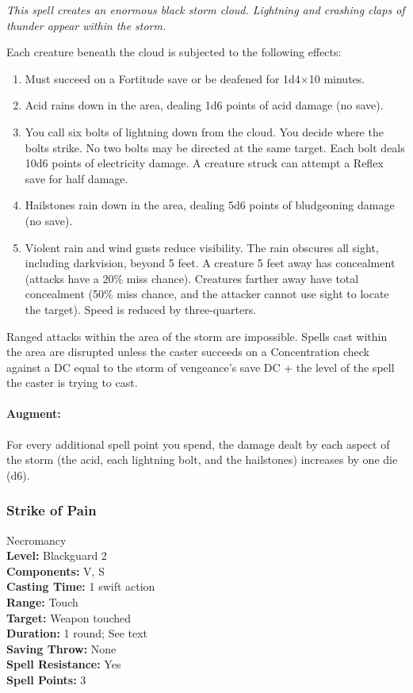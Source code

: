 \emph{This spell creates an enormous black storm cloud. Lightning and crashing claps of thunder appear within the storm. }

Each creature beneath the cloud is subjected to the following effects:

\begin{enumerate}
 \item Must succeed on a Fortitude save or be deafened for 1d4$\times$10 minutes.
 \item Acid rains down in the area, dealing 1d6 points of acid damage (no save).
 \item You call six bolts of lightning down from the cloud. You decide where the bolts strike. No two bolts may be directed at the same target. Each bolt deals 10d6 points of electricity damage. A creature struck can attempt a Reflex save for half damage.
 \item Hailstones rain down in the area, dealing 5d6 points of bludgeoning damage (no save).
 \item Violent rain and wind gusts reduce visibility. The rain obscures all sight, including darkvision, beyond 5 feet. A creature 5 feet away has concealment (attacks have a 20\% miss chance). Creatures farther away have total concealment (50\% miss chance, and the attacker cannot use sight to locate the target). Speed is reduced by three-quarters.
\end{enumerate}
Ranged attacks within the area of the storm are impossible. 
Spells cast within the area are disrupted unless the caster succeeds on a Concentration check against a DC equal to the storm of vengeance's save DC + the level of the spell the caster is trying to cast.
\paragraph{Augment:} For every additional spell point you spend, the damage dealt by each aspect of the storm (the acid, each lightning bolt, and the hailstones) increases by one die (d6).
\subsubsection{Strike of Pain}
\label{Spell:StrikeOfPain}
Necromancy
\\ \textbf{Level:} Blackguard 2
\\ \textbf{Components:} V, S
\\ \textbf{Casting Time:} 1 swift action
\\ \textbf{Range:} Touch
\\ \textbf{Target:} Weapon touched
\\ \textbf{Duration:} 1 round; See text
\\ \textbf{Saving Throw:} None
\\ \textbf{Spell Resistance:} Yes
\\ \textbf{Spell Points:} 3

